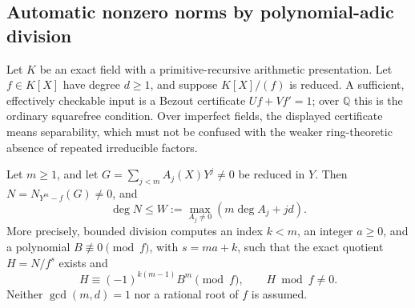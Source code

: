 \subsection{Automatic nonzero norms by polynomial-adic division}
\label{sec:adic-squarefree-compact}

Let \(K\) be an exact field with a primitive-recursive arithmetic
presentation.  Let \(f\in K[X]\) have degree \(d\geq1\), and suppose
\(K[X]/(f)\) is reduced.  A sufficient, effectively checkable input is
a Bezout certificate \(Uf+Vf'=1\); over \(\mathbb Q\) this is the
ordinary squarefree condition.  Over imperfect fields, the displayed
certificate means separability, which must not be confused with the
weaker ring-theoretic absence of repeated irreducible factors.

\begin{theorem}
\label{thm:adic-squarefree-compact}
Let \(m\geq1\), and let
\(G=\sum_{j<m}A_j(X)Y^j\ne0\) be reduced in \(Y\).
Then \(N=N_{Y^m-f}(G)\ne0\), and
\[
 \deg N\leq W:=\max_{A_j\ne0}(m\deg A_j+jd).
\]
More precisely, bounded division computes an index \(k<m\), an integer
\(a\geq0\), and a polynomial \(B\not\equiv0\pmod f\), with
\(s=ma+k\), such that the exact quotient \(H=N/f^s\) exists and
\begin{equation}
 \label{eq:adic-exact-residue}
 H\equiv(-1)^{k(m-1)}B^m\pmod f,
 \qquad H\bmod f\ne0.
\end{equation}
Neither \(\gcd(m,d)=1\) nor a rational root of \(f\) is assumed.
\end{theorem}

